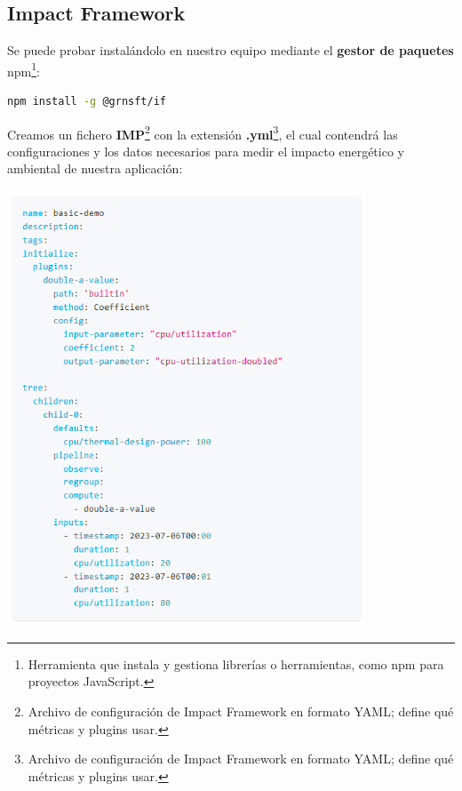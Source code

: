 \documentclass[12pt,a4paper]{report}
\begin{document}
\subsection{Impact Framework}
Se puede probar instalándolo en nuestro equipo mediante el \textbf{gestor de
  paquetes} npm\footnote{Herramienta que instala y gestiona librerías o
  herramientas, como npm para proyectos JavaScript.}:

\begin{tcolorbox}[colback=codebackground, colframe=codeborder, boxrule=0.8pt, arc=0mm, boxsep=5pt, left=5pt, right=5pt, top=5pt, bottom=5pt]
  \begin{lstlisting}[language=bash]
  npm install -g @grnsft/if
  \end{lstlisting}
\end{tcolorbox}

Creamos un fichero \textbf{IMP}\footnote{Archivo de configuración de Impact
  Framework en formato YAML; define qué métricas y plugins usar.} con la
extensión \textbf{.yml}\footnote{Archivo de configuración de Impact Framework
  en formato YAML; define qué métricas y plugins usar.}, el cual contendrá las
configuraciones y los datos necesarios para medir el impacto energético y
ambiental de nuestra aplicación:

\begin{center}
  \includegraphics[width=0.8\textwidth]{imagenes/IF_1.png}
\end{center}
\end{document}
